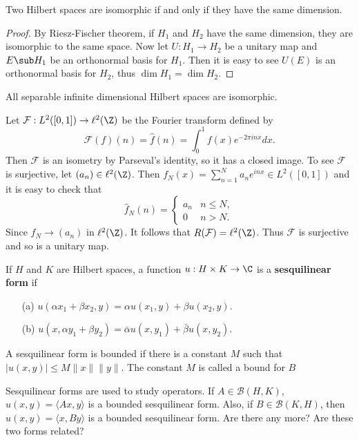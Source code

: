 \begin{theorem}\label{Hilbert space isomorphic iff dim}
Two Hilbert spaces are isomorphic if and only if they have the same dimension.
\end{theorem}
\begin{proof}
By Riesz-Fischer theorem, if $H_1$ and $H_2$ have the same dimension, they are isomorphic to the same space. Now let $U:H_1\to H_2$ be a unitary map and $E\sub H_1$ be an orthonormal basis for $H_1$. Then it is easy to see $U(E)$ is an orthonormal basis for $H_2$, thus $\dim H_1=\dim H_2$.
\end{proof}
\begin{corollary}
All separable infinite dimensional Hilbert spaces are isomorphic.
\end{corollary}
\begin{example}
Let $\mathcal{F}:L^2([0,1])\to\ell^2(\Z)$ be the Fourier transform defined by
\[\mathcal{F}(f)(n)=\hat{f}(n)=\int_{0}^{1}f(x)e^{-2\pi inx}dx.\]
Then $\mathcal{F}$ is an isometry by Parseval's identity, so it has a closed image. To see $\mathcal{F}$ is surjective, let $(a_n)\in\ell^2(\Z)$. Then $f_N(x)=\sum_{n=1}^{N}a_ne^{inx}\in L^2([0,1])$ and it is easy to check that
\[\hat{f}_N(n)=\begin{cases}
a_n&n\leq N,\\
0&n>N.
\end{cases}\]
Since $\hat{f}_N\to(a_n)$ in $\ell^2(\Z)$. It follows that $R(\mathcal{F})=\ell^2(\Z)$. Thus $\mathcal{F}$ is surjective and so is a unitary map.
\end{example}
\begin{definition}
If $H$ and $K$ are Hilbert spaces, a function $u:H\times K\to\C$ is a \textbf{sesquilinear form} if
\begin{itemize}
\item[(a)] $u(\alpha x_1+\beta x_2,y)=\alpha u(x_1,y)+\beta u(x_2,y)$.
\item[(b)] $u(x,\alpha y_1+\beta y_2)=\bar{\alpha}u(x,y_1)+\bar{\beta}u(x,y_2)$.
\end{itemize}
A sesquilinear form is bounded if there is a constant $M$ such that $|u(x,y)|\leq M\|x\|\|y\|$. The constant $M$ is called a bound for $B$
\end{definition}
Sesquilinear forms are used to study operators. If $A\in\mathcal{B}(H,K)$, $u(x,y)=\langle Ax,y\rangle$ is a bounded sesquilinear form. Also, if $B\in\mathcal{B}(K,H)$, then $u(x,y)=\langle x,By\rangle$ is a bounded sesquilinear form. Are there any more? Are these two forms related?
